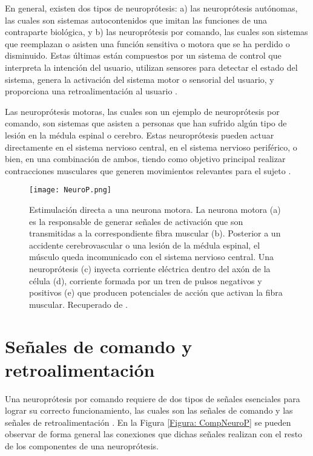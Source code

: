 En general, existen dos tipos de neuroprótesis: a) las neuroprótesis autónomas, las cuales son sistemas autocontenidos que imitan las funciones de una contraparte biológica, y b) las neuroprótesis por comando, las cuales son sistemas que reemplazan o asisten una función sensitiva o motora que se ha perdido o disminuido. Estas últimas están compuestos por un sistema de control que interpreta la intención del usuario, utilizan sensores para detectar el estado del sistema, genera la activación del sistema motor o sensorial del usuario, y proporciona una retroalimentación al usuario \cite{Popovic2015}.

Las neuroprótesis motoras, las cuales son un ejemplo de neuroprótesis por comando, son sistemas que asisten a personas que han sufrido algún tipo de lesión en la médula espinal o cerebro. Estas neuroprótesis pueden actuar directamente en el sistema nervioso central, en el sistema nervioso periférico, o bien, en una combinación de ambos, tiendo como objetivo principal realizar contracciones musculares que generen movimientos relevantes para el sujeto \cite{Popovic2015}.

\begin{figure}[htbp]
	\centering
	\texttt{[image: NeuroP.png]}
	\caption[Estimulación directa a una neurona motora]{Estimulación directa a una neurona motora. La neurona motora (a) es la responsable de generar señales de activación que son transmitidas a la correspondiente fibra muscular (b). Posterior a un accidente cerebrovascular o una lesión de la médula espinal, el músculo queda incomunicado con el sistema nervioso central. Una neuroprótesis (c) inyecta corriente eléctrica dentro del axón de la célula (d), corriente formada por un tren de pulsos negativos y positivos (e) que producen potenciales de acción que activan la fibra muscular. Recuperado de \cite{Popovic2008}.}
	\label{Figura: NeuroP}
\end{figure}

\section{Señales de comando y retroalimentación}\label{Seccion: ComRetro}

Una neuroprótesis por comando requiere de dos tipos de señales esenciales para lograr su correcto funcionamiento, las cuales son las señales de comando y las señales de retroalimentación \cite{Popovic2015}. En la Figura \ref{Figura: CompNeuroP} se pueden observar de forma general las conexiones que dichas señales realizan con el resto de los componentes de una neuroprótesis.

